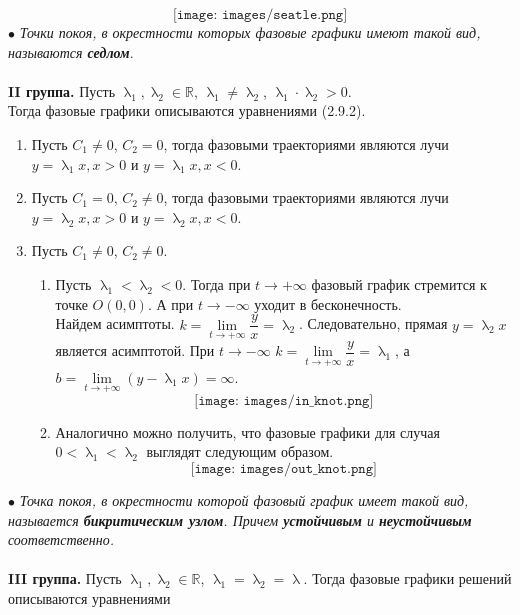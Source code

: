 \documentclass[a4paper, 12pt]{report}
\newcommand{\Rm}{\mathbb{R}}
\newcommand{\ra}{\rightarrow}
\renewcommand{\lambda}{\uplambda}
\begin{document}
$$\texttt{[image: images/seatle.png]}$$
$\bullet$ \textit{Точки покоя, в окрестности которых фазовые графики имеют такой вид, называются \textbf{седлом}}.\\\\
\textbf{II группа.} Пусть $\lambda_1, \lambda_2 \in \Rm$, $\lambda_1 \ne \lambda_2$, $\lambda_1\cdot\lambda_2 > 0$. \\
Тогда фазовые графики описываются уравнениями (2.9.2).\begin{enumerate}
	\item Пусть $C_1 \ne 0$, $C_2 = 0$, тогда фазовыми траекториями являются лучи $y = \lambda_1x, x>0$ и $y = \lambda_1x, x<0$.
	\item Пусть $C_1 = 0$, $C_2 \ne 0$, тогда фазовыми траекториями являются лучи $y = \lambda_2x, x>0$ и $y = \lambda_2x, x<0$.
	\item Пусть $C_1 \ne 0$, $C_2 \ne 0$.\begin{enumerate}
		\item Пусть $\lambda_1 < \lambda_2 < 0$. Тогда при $t\ra +\infty$ фазовый график стремится к точке $O(0, 0)$. А при $t\ra -\infty$ уходит в бесконечность.\\
		Найдем асимптоты. $k = \lim\limits_{t\ra +\infty}\dfrac{y}{x} = \lambda_2$. Следовательно, прямая $y = \lambda_2 x$ является асимптотой. При $t\ra -\infty$ $k = \lim\limits_{t\ra +\infty}\dfrac{y}{x} = \lambda_1$, а $b = \lim\limits_{t\ra +\infty} (y-\lambda_1x) = \infty$.
		$$\texttt{[image: images/in\_knot.png]}$$
		\item Аналогично можно получить, что фазовые графики для случая $0 < \lambda_1 < \lambda_2$ выглядят следующим образом.
		$$\texttt{[image: images/out\_knot.png]}$$
	\end{enumerate}
\end{enumerate}
$\bullet$ \textit{Точка покоя, в окрестности которой фазовый график имеет такой вид, называется \textbf{бикритическим узлом}. Причем \textbf{устойчивым} и \textbf{неустойчивым} соответственно.}\\\\
\textbf{III группа.} Пусть $\lambda_1, \lambda_2 \in \Rm$, $\lambda_1 = \lambda_2 =\lambda$. Тогда фазовые графики решений описываются уравнениями
\end{document}
